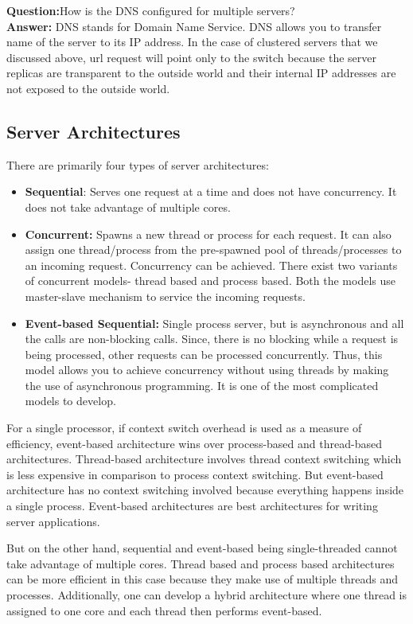 \documentclass[twoside]{article}
\begin{document}
\textbf{Question:}How is the DNS configured for multiple servers?
\\ \textbf{Answer:} DNS stands for Domain Name Service. DNS allows you to transfer name of the server to its IP address. In the case of clustered servers that we discussed above, url request will point only to the switch because the server replicas are transparent to the outside world and their internal IP addresses are not exposed to the outside world. 


\subsection{Server Architectures}
There are primarily four types of server architectures:
\begin{itemize}
    \item \textbf{Sequential}: Serves one request at a time and does not have concurrency. It does not take advantage of multiple cores.
    \item \textbf{Concurrent:} Spawns a new thread or process for each request. It can also assign one thread/process from the pre-spawned pool of threads/processes to an incoming request. Concurrency can be achieved. There exist two variants of concurrent models- thread based and process based. Both the models use master-slave mechanism to service the incoming requests.
    \item \textbf{Event-based Sequential:} Single process server, but is asynchronous and all the calls are non-blocking calls. Since, there is no blocking while a request is being processed, other requests can be processed concurrently. Thus, this model allows you to achieve concurrency without using threads by making the use of asynchronous programming. It is one of the most complicated models to develop.
\end{itemize}

For a single processor, if context switch overhead is used as a measure of efficiency, event-based architecture wins over process-based and thread-based architectures. Thread-based architecture involves thread context switching which is less expensive in comparison to process context switching. But event-based architecture has no context switching involved because everything happens inside a single process. Event-based architectures are best architectures for writing server applications.

But on the other hand, sequential and event-based being single-threaded cannot take advantage of multiple cores. Thread based and process based architectures can be more efficient in this case because they make use of multiple threads and processes. Additionally, one can develop a hybrid architecture where one thread is assigned to one core and each thread then performs event-based. 
\end{document}
